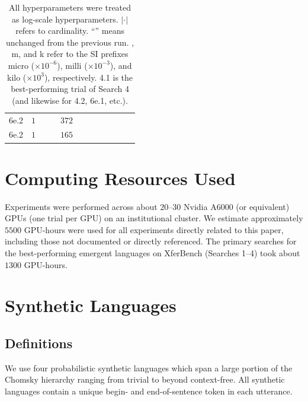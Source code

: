 \begin{table}
\begin{tabular}{lrrrrrrrrrrr}
    6e.2 & $1$   & \dit{}   &   \dit{} & $372$      & \dit{}      & \dit{}     & \dit{}     & \dit{}                           & \dit{}             & \dit{}   & \dit{}            \\
    6e.2 & $1$   & \dit{}   &   \dit{} & $165$      & \dit{}      & \dit{}     & \dit{}     & \dit{}                           & \dit{}             & \dit{}   & \dit{}            \\
    \bottomrule
  \end{tabular}
  \caption{All hyperparameters were treated as log-scale hyperparameters. $|{\cdot}|$ refers to cardinality. ``\dit{}'' means unchanged from the previous run. \textmu, m, and k refer to the SI prefixes micro ($\times10^{-6}$), milli ($\times10^{-3}$), and kilo ($\times10^{3}$), respectively.  4.1 is the best-performing trial of Search 4 (and likewise for 4.2, 6e.1, etc.).}
  \unskip\label{tab:hp-search-all}
\end{table}

\section{Computing Resources Used}
\unskip\label{hpo:sec:resources}
Experiments were performed across about $20$--$30$ Nvidia A6000 (or equivalent) GPUs (one trial per GPU) on an institutional cluster.
We estimate approximately $5500$ GPU-hours were used for all experiments directly related to this paper, including those not documented or directly referenced.
The primary searches for the best-performing emergent languages on XferBench (Searches 1--4) took about $1300$ GPU-hours.


\section{Synthetic Languages}
\unskip\label{hpo:sec:synth}
\subsection{Definitions}
We use four probabilistic synthetic languages which span a large portion of the Chomsky hierarchy ranging from trivial to beyond context-free.
All synthetic languages contain a unique begin- and end-of-sentence token in each utterance.

